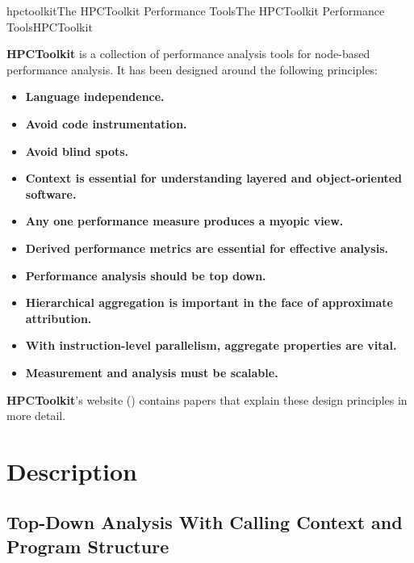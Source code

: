 \documentclass[english]{article}
\begin{document}
\begin{Name}{1}{hpctoolkit}{The HPCToolkit Performance Tools}{The HPCToolkit Performance Tools}{HPCToolkit}

\textbf{HPCToolkit} is a collection of performance analysis tools for node-based performance analysis.
It has been designed around the following principles:
\begin{itemize}

\item \textbf{Language independence.}
\item \textbf{Avoid code instrumentation.}
\item \textbf{Avoid blind spots.}
\item \textbf{Context is essential for understanding layered and object-oriented software.}
\item \textbf{Any one performance measure produces a myopic view.}
\item \textbf{Derived performance metrics are essential for effective analysis.}
\item \textbf{Performance analysis should be top down.}
\item \textbf{Hierarchical aggregation is important in the face of approximate attribution.} 
\item \textbf{With instruction-level parallelism, aggregate properties are vital.}
\item \textbf{Measurement and analysis must be scalable.}

\end{itemize}

\textbf{HPCToolkit}'s website () contains papers that explain these design principles in more detail.

\end{Name}

\section{Description}

\subsection{Top-Down Analysis With Calling Context and Program Structure}
\end{document}
